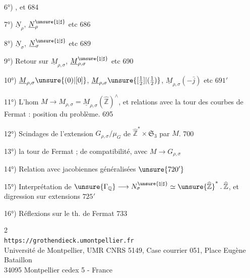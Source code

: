 6°)  
,
et
\hfill 684

7°) $\underline N_\rho$, $\underline N_\rho^{\unsure{\natural|\sharp}}$ etc \hfill 686

8°) $\underline N_\sigma$, $\underline N_\sigma^{\unsure{\natural|\sharp}}$ etc \hfill 689

9°) Retour sur $\underline M_{\rho,\sigma}$, $\underline M_{\rho,\sigma}^{\unsure{\natural|\sharp}}$ etc \hfill 690

10°) $\underline M_{\rho,\sigma}\unsure{(0)|[0]}$, $\underline M_{\rho,\sigma}\unsure{[\tfrac12]|(\tfrac12)}$, $\underline M_{\rho,\sigma}(-\bar j)$ etc \hfill $691'$

11°) L'hom $M\longrightarrow M_{\rho,\sigma}=\underline M_{\rho,\sigma}(\widehat{\mathbb Z})^{\wedge}$, et relations avec la tour des courbes de Fermat : position du problème. \hfill 695

12°) Scindages de l'extension $G_{\rho,\sigma}/\mu_G$ de $\widehat{\mathbb Z}^{*}\times\mathfrak S_3$ par $\widehat M$. \hfill 700

13°)  la tour de Fermat ;   de compatibilité, avec $M\longrightarrow G_{\rho,\sigma}$ \hfill {}

14°) Relation avec jacobiennes généralisées \hfill $\unsure{720'}$

15°) Interprétation de $\unsure{\Gamma_{\mathbb Q}}\longrightarrow N_\sigma^{\unsure{\natural|\sharp}}\simeq\unsure{\widehat{\mathbb Z}}^{*}\mathbin{.}\widehat{\mathbb Z}$, et digression sur extensions  \hfill $725'$

16°) Réflexions sur le th. de Fermat \hfill 733


\begin{center}
\small
2\\
\texttt{https://grothendieck.umontpellier.fr}\\
Université de Montpellier, UMR CNRS 5149, Case courrier 051, Place Eugène Bataillon\\
34095 Montpellier cedex 5 - France
\end{center}

